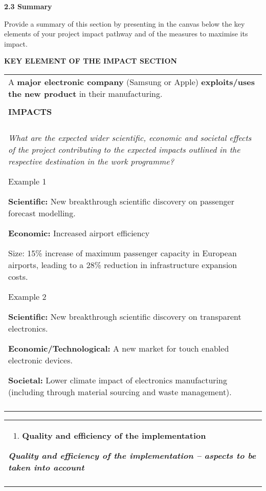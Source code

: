 \textbf{2.3 Summary }

Provide a summary of this section by presenting in the canvas below the
key elements of your project impact pathway and of the measures to
maximise its impact.

\textbf{KEY ELEMENT OF THE IMPACT SECTION}

\begin{longtable}[]{@{}
  >{\raggedright\arraybackslash}p{}@{}}
\toprule
\endhead
A \textbf{major electronic company} (Samsung or Apple)
\textbf{exploits/uses the new product} in their manufacturing. \\
 \\
\textbf{IMPACTS} \\
 \\
\emph{What are the expected wider scientific, economic and societal
effects of the project contributing to the expected impacts outlined in
the respective destination in the work programme?}

Example 1

\textbf{Scientific: } New breakthrough scientific discovery on passenger
forecast modelling.

\textbf{Economic:} Increased airport efficiency

Size: 15\% increase of maximum passenger capacity in European airports,
leading to a 28\% reduction in infrastructure expansion costs.

Example 2

\textbf{Scientific:} New breakthrough scientific discovery on
transparent electronics.

\textbf{Economic/Technological:} A new market for touch enabled
electronic devices.

\textbf{Societal:} Lower climate impact of electronics manufacturing
(including through material sourcing and waste management). \\
 \\
\bottomrule
\end{longtable}

\begin{longtable}[]{@{}
  >{\raggedright\arraybackslash}p{}@{}}
\toprule
\endhead
\begin{enumerate}
\def\labelenumi{\arabic{enumi}.}
\setcounter{enumi}{2}
\item
  \textbf{Quality and efficiency of the implementation}
\end{enumerate}

\textbf{\emph{Quality and efficiency of the implementation}\emph{
}\emph{--}\emph{ aspects to be taken into account}} \\
 \\
\bottomrule
\end{longtable}

